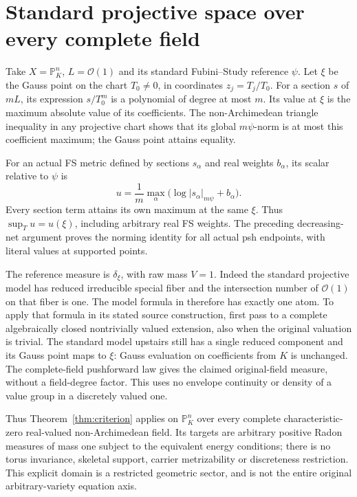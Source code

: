 \documentclass[11pt]{article}
\begin{document}
\section{Standard projective space over every complete field}

Take $X=\mathbb P^n_K$, $L=\mathcal O(1)$ and its standard
Fubini--Study reference $\psi$. Let $\xi$ be the Gauss point on
the chart $T_0\ne0$, in coordinates $z_j=T_j/T_0$. For a section
$s$ of $mL$, its expression $s/T_0^m$ is a polynomial of degree
at most $m$. Its value at $\xi$ is the maximum absolute value of
its coefficients. The non-Archimedean triangle inequality in any
projective chart shows that its global $m\psi$-norm is at most
this coefficient maximum; the Gauss point attains equality.

For an actual FS metric defined by sections $s_\alpha$ and real
weights $b_\alpha$, its scalar relative to $\psi$ is
\[
 u=\frac1m\max_\alpha\bigl(\log|s_\alpha|_{m\psi}
                                      +b_\alpha\bigr).
\]
Every section term attains its own maximum at the same $\xi$.
Thus $\sup_Tu=u(\xi)$, including arbitrary real FS weights.
The preceding decreasing-net argument proves the norming identity
for all actual psh endpoints, with literal values at supported points.

The reference measure is $\delta_\xi$, with raw mass $V=1$.
Indeed the standard projective model has reduced irreducible special
fiber and the intersection number of $\mathcal O(1)$ on that fiber
is one. The model formula in \cite[Example 8.11, formula (8.3)]{BE}
therefore has exactly one atom. To apply that formula in its stated
source construction, first pass to a complete algebraically closed
nontrivially valued extension, also when the original valuation is
trivial. The standard model upstairs still has a single reduced
component and its Gauss point maps to $\xi$: Gauss evaluation on
coefficients from $K$ is unchanged. The complete-field pushforward
law gives the claimed original-field measure, without a field-degree
factor. This uses no envelope continuity or density of a value group
in a discretely valued one.

Thus Theorem~\ref{thm:criterion} applies on $\mathbb P^n_K$ over
every complete characteristic-zero real-valued non-Archimedean
field. Its targets are arbitrary positive Radon measures of mass
one subject to the equivalent energy conditions; there is no torus
invariance, skeletal support, carrier metrizability or discreteness
restriction. This explicit domain is a restricted geometric sector,
and is not the entire original arbitrary-variety equation axis.
\end{document}
